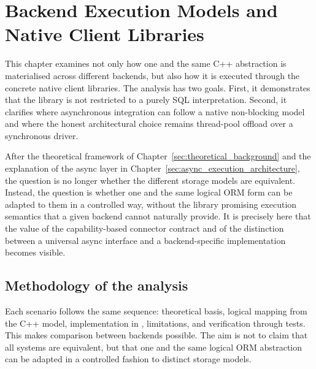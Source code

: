 \section{Backend Execution Models and Native Client Libraries}
\label{sec:backend_scenarios}

This chapter examines not only how one and the same C++ abstraction is materialised across different backends, but also how it is executed through the concrete native client libraries. The analysis has two goals. First, it demonstrates that the library is not restricted to a purely SQL interpretation. Second, it clarifies where asynchronous integration can follow a native non-blocking model and where the honest architectural choice remains thread-pool offload over a synchronous driver.

After the theoretical framework of Chapter~\ref{sec:theoretical_background} and the explanation of the async layer in Chapter~\ref{sec:async_execution_architecture}, the question is no longer whether the different storage models are equivalent. Instead, the question is whether one and the same logical ORM form can be adapted to them in a controlled way, without the library promising execution semantics that a given backend cannot naturally provide. It is precisely here that the value of the capability-based connector contract and of the distinction between a universal async interface and a backend-specific implementation becomes visible.

\subsection{Methodology of the analysis}

Each scenario follows the same sequence: theoretical basis, logical mapping from the C++ model, implementation in , limitations, and verification through tests. This makes comparison between backends possible. The aim is not to claim that all systems are equivalent, but that one and the same logical ORM abstraction can be adapted in a controlled fashion to distinct storage models.

